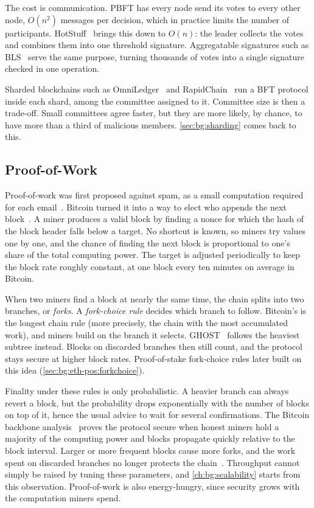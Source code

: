 The cost is communication.
PBFT has every node send its votes to every other node, $O(n^2)$ messages per decision, which in practice limits the number of participants.
HotStuff~\cite{yin2019hotstuff} brings this down to $O(n)$: the leader collects the votes and combines them into one threshold signature.
Aggregatable signatures such as BLS~\cite{boneh2001short,boneh2003aggregate} serve the same purpose, turning thousands of votes into a single signature checked in one operation.

Sharded blockchains such as OmniLedger~\cite{omniLedger} and RapidChain~\cite{rapidchain} run a BFT protocol inside each shard, among the committee assigned to it.
Committee size is then a trade-off.
Small committees agree faster, but they are more likely, by chance, to have more than a third of malicious members.
\autoref{sec:bg:sharding} comes back to this.

\subsection{Proof-of-Work}\label{sec:bg:consensus:pow}

Proof-of-work was first proposed against spam, as a small computation required for each email~\cite{dwork1992pricing}.
Bitcoin turned it into a way to elect who appends the next block~\cite{nakamoto2008bitcoin}.
A miner produces a valid block by finding a nonce for which the hash of the block header falls below a target.
No shortcut is known, so miners try values one by one, and the chance of finding the next block is proportional to one's share of the total computing power.
The target is adjusted periodically to keep the block rate roughly constant, at one block every ten minutes on average in Bitcoin.

When two miners find a block at nearly the same time, the chain splits into two branches, or \emph{forks}.
A \emph{fork-choice rule} decides which branch to follow.
Bitcoin's is the longest chain rule (more precisely, the chain with the most accumulated work), and miners build on the branch it selects.
GHOST~\cite{sompolinsky2015ghost} follows the heaviest subtree instead.
Blocks on discarded branches then still count, and the protocol stays secure at higher block rates.
Proof-of-stake fork-choice rules later built on this idea (\autoref{sec:bg:eth-pos:forkchoice}).

Finality under these rules is only probabilistic.
A heavier branch can always revert a block, but the probability drops exponentially with the number of blocks on top of it, hence the usual advice to wait for several confirmations.
The Bitcoin backbone analysis~\cite{garay2015backbone} proves the protocol secure when honest miners hold a majority of the computing power and blocks propagate quickly relative to the block interval.
Larger or more frequent blocks cause more forks, and the work spent on discarded branches no longer protects the chain~\cite{gervais2016security}.
Throughput cannot simply be raised by tuning these parameters, and \autoref{ch:bg:scalability} starts from this observation.
Proof-of-work is also energy-hungry, since security grows with the computation miners spend.

